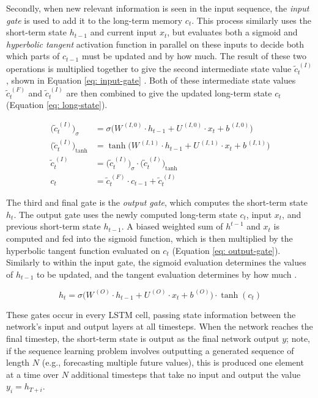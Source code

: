 \documentclass[a4paper, 11pt]{report}
\begin{document}
    Secondly, when new relevant information is seen in the input sequence, the \emph{input gate} is used to add it to the long-term memory $c_t$. This process similarly uses the short-term state $h_{t-1}$ and current input $x_t$, but evaluates both a sigmoid and \emph{hyperbolic tangent} activation function in parallel on these inputs to decide both which parts of $c_{t-1}$ must be updated and by how much. The result of these two operations is multiplied together to give the second intermediate state value $\tilde{c}^{\,(I)}_t$, shown in Equation \ref{eq: input-gate} \citep{zhang-2021}. Both of these intermediate state values $\tilde{c}^{\,(F)}_t$ and $\tilde{c}^{\,(I)}_t$ are then combined to give the updated long-term state $c_t$ (Equation \ref{eq: long-state}).

    \begin{align}
        \Big( \tilde{c}^{\,(I)}_t \Big)_{\sigma} &= \sigma \Big( W^{\,(I,0)} \cdot h_{t-1} + U^{\,(I,0)} \cdot x_t + b^{\,(I,0)} \Big) \\
        \Big( \tilde{c}^{\,(I)}_t \Big)_{\tanh} &= \tanh{\Big( W^{\,(I,1)} \cdot h_{t-1} + U^{\,(I,1)} \cdot x_t + b^{\,(I,1)} \Big)} \\
        \tilde{c}^{\,(I)}_t &= \Big( \tilde{c}^{\,(I)}_t \Big)_{\sigma} \cdot \Big( \tilde{c}^{\,(I)}_t \Big)_{\tanh}
        \label{eq: input-gate} \\
        c_t &= \tilde{c}^{\,(F)}_t \cdot c_{t-1} + \tilde{c}^{\,(I)}_t
        \label{eq: long-state}
    \end{align}

    The third and final gate is the \emph{output gate}, which computes the short-term state $h_t$. The output gate uses the newly computed long-term state $c_t$, input $x_t$, and previous short-term state $h_{t-1}$. A biased weighted sum of $h^{t-1}$ and $x_t$ is computed and fed into the sigmoid function, which is then multiplied by the hyperbolic tangent function evaluated on $c_t$ (Equation \ref{eq: output-gate}). Similarly to within the input gate, the sigmoid evaluation determines the values of $h_{t-1}$ to be updated, and the tangent evaluation determines by how much \citep{zhang-2021}.

    \begin{equation}
        \label{eq: output-gate}
        h_t = \sigma \Big( W^{\,(O)} \cdot h_{t-1} + U^{\,(O)} \cdot x_t + b^{\,(O)} \Big) \cdot \tanh{( c_t )}
    \end{equation}

    These gates occur in every LSTM cell, passing state information between the network's input and output layers at all timesteps. When the network reaches the final timestep, the short-term state is output as the final network output $y$; note, if the sequence learning problem involves outputting a generated sequence of length $N$ (e.g., forecasting multiple future values), this is produced one element at a time over $N$ additional timesteps that take no input and output the value $y_i = h_{T+i}$.
\end{document}
